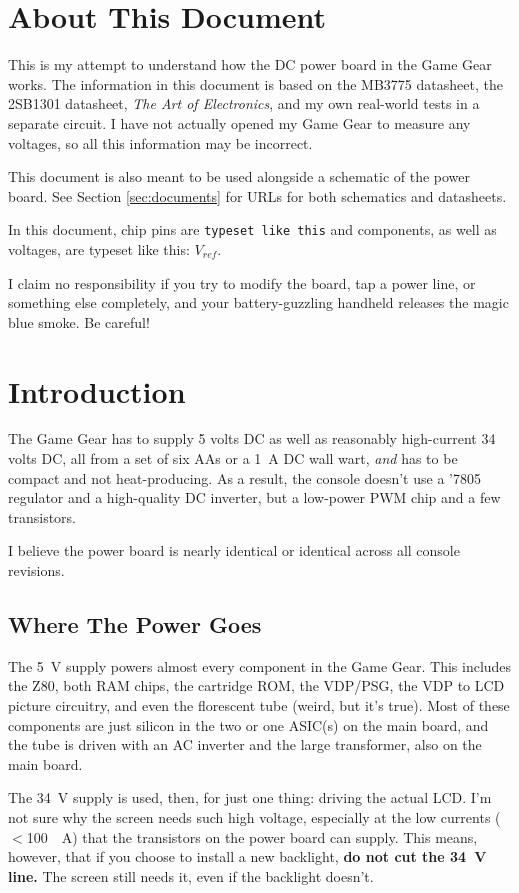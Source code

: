 \documentclass{article}
\newcommand{\Vref}{$V_{ref}$}
\newcommand{\chippin}{\texttt}
\begin{document}
\section{About This Document}
This is my attempt to understand how the DC power board in the Game
Gear works. The information in this document is based on the MB3775
datasheet, the 2SB1301 datasheet, \textit{The Art of Electronics}, and
my own real-world tests in a separate circuit. I have not actually
opened my Game Gear to measure any voltages, so all this information
may be incorrect.

This document is also meant to be used alongside a schematic of the
power board. See Section \ref{sec:documents} for URLs for both
schematics and datasheets.

In this document, chip pins are \chippin{typeset like this} and
components, as well as voltages, are typeset like this: \Vref{}.

I claim no responsibility if you try to modify the board, tap a power
line, or something else completely, and your battery-guzzling handheld
releases the magic blue smoke. Be careful!

\section{Introduction}
The Game Gear has to supply 5 volts DC as well as reasonably
high-current 34 volts DC, all from a set of six AAs or a \qty{1}{A} DC
wall wart, \textit{and} has to be compact and not heat-producing. As a
result, the console doesn't use a '7805 regulator and a high-quality
DC inverter, but a low-power PWM chip and a few transistors.

I believe the power board is nearly identical or identical across all
console revisions.

\subsection{Where The Power Goes}
The \qty{5}{\volt} supply powers almost every component in the Game
Gear. This includes the Z80, both RAM chips, the cartridge ROM, the
VDP/PSG, the VDP to LCD picture circuitry, and even the florescent
tube (weird, but it's true). Most of these components are just silicon
in the two or one ASIC(s) on the main board, and the tube is driven
with an AC inverter and the large transformer, also on the main board.

The \qty{34}{\volt} supply is used, then, for just one thing: driving
the actual LCD. I'm not sure why the screen needs such high voltage,
especially at the low currents ($<$\qty{100}{\milli{}A}) that the
transistors on the power board can supply. This means, however, that
if you choose to install a new backlight, \textbf{do not cut the
  \qty{34}{\volt} line.} The screen still needs it, even if the
backlight doesn't.
\end{document}
